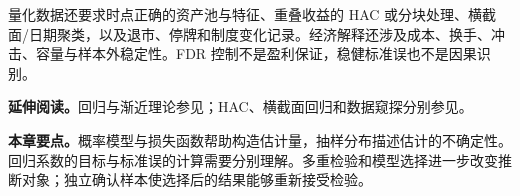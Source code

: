量化数据还要求时点正确的资产池与特征、重叠收益的 HAC 或分块处理、横截面/日期聚类，以及退市、停牌和制度变化记录。经济解释还涉及成本、换手、冲击、容量与样本外稳定性。FDR 控制不是盈利保证，稳健标准误也不是因果识别。


\noindent\textbf{延伸阅读。}回归与渐近理论参见\cite{hayashi2000econometrics,vanderVaart1998asymptotic}；HAC、横截面回归和数据窥探分别参见\cite{newey1987hac,fama1973risk,white2000reality}。




\noindent\textbf{本章要点。}概率模型与损失函数帮助构造估计量，抽样分布描述估计的不确定性。回归系数的目标与标准误的计算需要分别理解。多重检验和模型选择进一步改变推断对象；独立确认样本使选择后的结果能够重新接受检验。